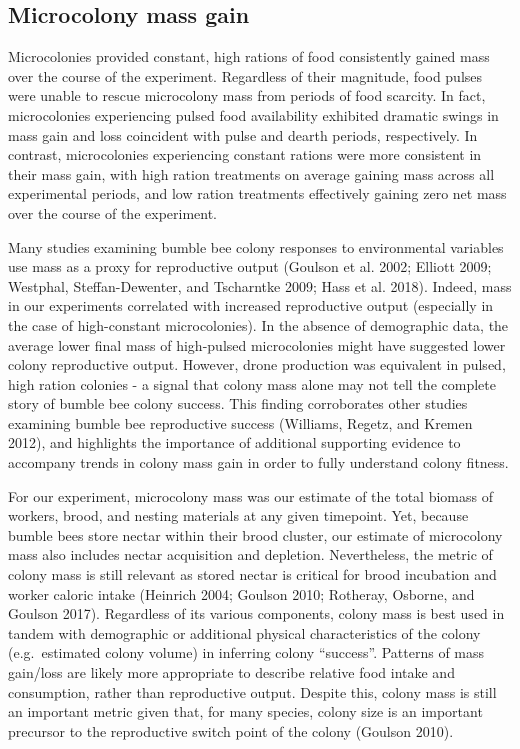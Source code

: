 \documentclass[11pt,]{article}
\begin{document}
\hypertarget{microcolony-mass-gain}{%
\subsection{Microcolony mass gain}\label{microcolony-mass-gain}}

Microcolonies provided constant, high rations of food consistently
gained mass over the course of the experiment. Regardless of their
magnitude, food pulses were unable to rescue microcolony mass from
periods of food scarcity. In fact, microcolonies experiencing pulsed
food availability exhibited dramatic swings in mass gain and loss
coincident with pulse and dearth periods, respectively. In contrast,
microcolonies experiencing constant rations were more consistent in
their mass gain, with high ration treatments on average gaining mass
across all experimental periods, and low ration treatments effectively
gaining zero net mass over the course of the experiment.

Many studies examining bumble bee colony responses to environmental
variables use mass as a proxy for reproductive output (Goulson et al.
2002; Elliott 2009; Westphal, Steffan-Dewenter, and Tscharntke 2009;
Hass et al. 2018). Indeed, mass in our experiments correlated with
increased reproductive output (especially in the case of high-constant
microcolonies). In the absence of demographic data, the average lower
final mass of high-pulsed microcolonies might have suggested lower
colony reproductive output. However, drone production was equivalent in
pulsed, high ration colonies - a signal that colony mass alone may not
tell the complete story of bumble bee colony success. This finding
corroborates other studies examining bumble bee reproductive success
(Williams, Regetz, and Kremen 2012), and highlights the importance of
additional supporting evidence to accompany trends in colony mass gain
in order to fully understand colony fitness.

For our experiment, microcolony mass was our estimate of the total
biomass of workers, brood, and nesting materials at any given timepoint.
Yet, because bumble bees store nectar within their brood cluster, our
estimate of microcolony mass also includes nectar acquisition and
depletion. Nevertheless, the metric of colony mass is still relevant as
stored nectar is critical for brood incubation and worker caloric intake
(Heinrich 2004; Goulson 2010; Rotheray, Osborne, and Goulson 2017).
Regardless of its various components, colony mass is best used in tandem
with demographic or additional physical characteristics of the colony
(e.g.~estimated colony volume) in inferring colony ``success''. Patterns
of mass gain/loss are likely more appropriate to describe relative food
intake and consumption, rather than reproductive output. Despite this,
colony mass is still an important metric given that, for many species,
colony size is an important precursor to the reproductive switch point
of the colony (Goulson 2010).
\end{document}
